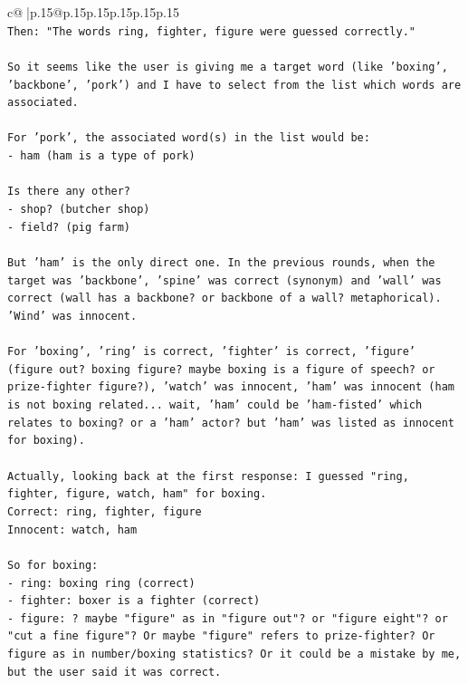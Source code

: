 \documentclass{article}
\begin{document}
{\begin{supertabular}{c@{$\;$}|p{.15\linewidth}@{}p{.15\linewidth}p{.15\linewidth}p{.15\linewidth}p{.15\linewidth}p{.15\linewidth}}
{{{\\ 
\texttt{Then: "The words ring, fighter, figure were guessed correctly."} \\
\\ 
\texttt{So it seems like the user is giving me a target word (like 'boxing', 'backbone', 'pork') and I have to select from the list which words are associated.} \\
\\ 
\texttt{For 'pork', the associated word(s) in the list would be:} \\
\texttt{{-} ham (ham is a type of pork)} \\
\\ 
\texttt{Is there any other?} \\
\texttt{{-} shop? (butcher shop)} \\
\texttt{{-} field? (pig farm)} \\
\\ 
\texttt{But 'ham' is the only direct one. In the previous rounds, when the target was 'backbone', 'spine' was correct (synonym) and 'wall' was correct (wall has a backbone? or backbone of a wall? metaphorical). 'Wind' was innocent.} \\
\\ 
\texttt{For 'boxing', 'ring' is correct, 'fighter' is correct, 'figure' (figure out? boxing figure? maybe boxing is a figure of speech? or prize{-}fighter figure?), 'watch' was innocent, 'ham' was innocent (ham is not boxing related... wait, 'ham' could be 'ham{-}fisted' which relates to boxing? or a 'ham' actor? but 'ham' was listed as innocent for boxing).} \\
\\ 
\texttt{Actually, looking back at the first response: I guessed "ring, fighter, figure, watch, ham" for boxing.} \\
\texttt{Correct: ring, fighter, figure} \\
\texttt{Innocent: watch, ham} \\
\\ 
\texttt{So for boxing:} \\
\texttt{{-} ring: boxing ring (correct)} \\
\texttt{{-} fighter: boxer is a fighter (correct)} \\
\texttt{{-} figure: ? maybe "figure" as in "figure out"? or "figure eight"? or "cut a fine figure"? Or maybe "figure" refers to prize{-}fighter? Or figure as in number/boxing statistics? Or it could be a mistake by me, but the user said it was correct.} \\
}}}
\end{supertabular}}
\end{document}
